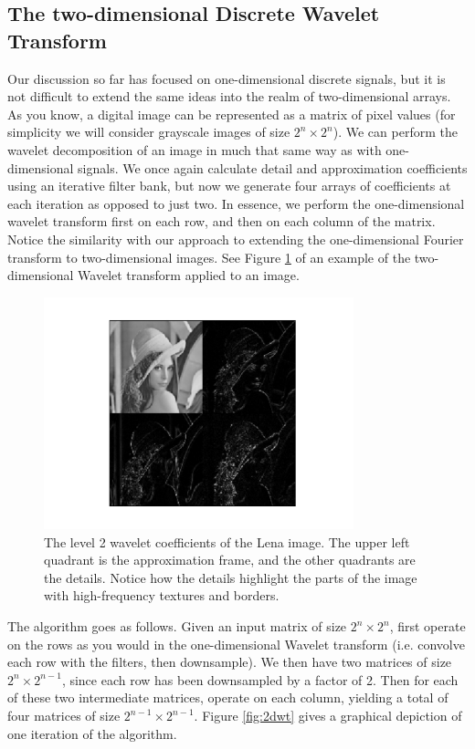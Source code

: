 \subsection*{The two-dimensional Discrete Wavelet Transform}
Our discussion so far has focused on one-dimensional
discrete signals, but it is not difficult to extend the same ideas into the
realm of two-dimensional arrays. As you know, a digital image can be represented
as a matrix of pixel values (for simplicity we will consider grayscale images of
size $2^n \times 2^n$). We can perform the wavelet decomposition of
an image in much that same way as with one-dimensional signals. We once again
calculate detail and approximation coefficients using an iterative filter
bank, but now we generate four arrays of coefficients at each iteration as opposed to
just two. In essence, we perform the one-dimensional wavelet transform first on each
row, and then on each column of the matrix. Notice the similarity with our approach
to extending the one-dimensional Fourier transform to two-dimensional images. See
Figure \ref{fig:dwt2D} of an example of the two-dimensional Wavelet transform applied
to an image.

\begin{figure}
    \includegraphics[width=0.8\textwidth]{dwt2D.pdf}
    \caption{The level 2 wavelet coefficients of the Lena image. The upper left quadrant
    is the approximation frame, and the other quadrants are the details. Notice how the
    details highlight the parts of the image with high-frequency textures and borders.}
    \label{fig:dwt2D}
\end{figure}

The algorithm goes as follows.
Given an input matrix of size $2^n \times 2^n$, first operate on the rows as you would
in the one-dimensional Wavelet transform (i.e. convolve each row with the filters, then
downsample).
We then have two matrices of size $2^n \times 2^{n-1}$,
since each row has been downsampled by a factor of 2. Then for each of these two
intermediate matrices, operate on each column, yielding a total of four matrices of
size $2^{n-1} \times 2^{n-1}$. Figure \ref{fig:2dwt}
gives a graphical depiction of one iteration of the algorithm.

